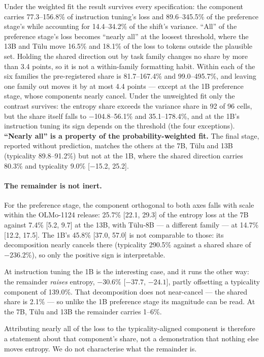 \documentclass[11pt]{article}
\begin{document}
Under the weighted fit the result survives every specification: the component
carries 77.3--156.8\% of instruction tuning's loss and 89.6--345.5\% of the
preference stage's while accounting for 14.4--34.2\% of the shift's variance.
``All'' of the preference stage's loss becomes ``nearly all'' at the loosest
threshold, where the 13B and T\"ulu move 16.5\% and 18.1\% of the loss to tokens
outside the plausible set. Holding the shared direction out by task family changes
no share by more than 3.4 points, so it is not a within-family formatting habit.
Within each of the six families the pre-registered share is 81.7--167.4\% and
99.0--495.7\%, and leaving one family out moves it by at most 4.4 points ---
except at the 1B preference stage, whose components nearly cancel. Under the
unweighted fit only the contrast survives: the entropy share exceeds the variance
share in 92 of 96 cells, but the share itself falls to $-$104.8--56.1\% and
35.1--178.4\%, and at the 1B's instruction tuning its sign depends on the threshold
(the four exceptions). \textbf{``Nearly all'' is a property of the
probability-weighted fit.} The final stage, reported without prediction, matches the
others at the 7B, T\"ulu and 13B (typicality 89.8--91.2\%) but not at the 1B, where
the shared direction carries 80.3\% and typicality 9.0\% [$-$15.2, 25.2].

\paragraph{The remainder is not inert.} For the preference stage, the component
orthogonal to both axes falls with scale within the OLMo-1124 release: 25.7\%
[22.1, 29.3] of the entropy loss at the 7B against 7.4\% [5.2, 9.7] at the 13B,
with T\"ulu-8B --- a different family --- at 14.7\% [12.2, 17.5]. The 1B's 45.8\%
[37.0, 57.0] is not comparable to those: its decomposition nearly cancels there
(typicality 290.5\% against a shared share of $-236.2\%$), so only the positive
sign is interpretable.

At instruction tuning the 1B is the interesting case, and it runs the other way:
the remainder \emph{raises} entropy, $-30.6\%$ [$-37.7$, $-24.1$], partly
offsetting a typicality component of 139.0\%. That decomposition does not
near-cancel --- the shared share is 2.1\% --- so unlike the 1B preference stage
its magnitude can be read. At the 7B, T\"ulu and 13B the remainder carries
1--6\%.

Attributing nearly all of the loss to the typicality-aligned component is
therefore a statement about that component's share, not a demonstration that
nothing else moves entropy. We do not characterise what the remainder is.
\end{document}

